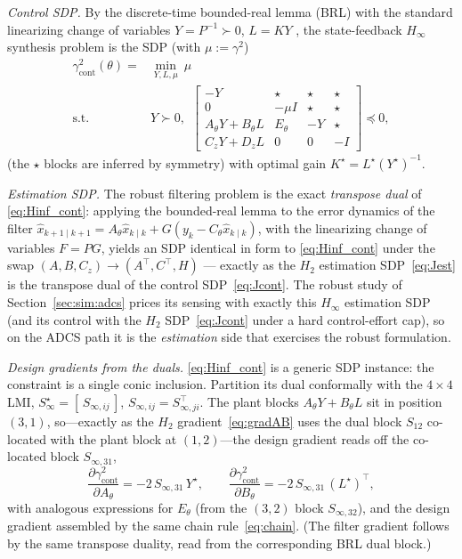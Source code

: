 \documentclass[twocolumn,amsthm]{autart}
\begin{document}
\emph{Control SDP.} By the discrete-time bounded-real lemma (BRL) with the standard
linearizing change of variables $Y = P^{-1}\succ 0$, $L = KY$
\cite{boyd1994linear,grigoriadis1998integrate}, the state-feedback $H_\infty$
synthesis problem is the SDP (with $\mu := \gamma^2$)
\begin{equation}\label{eq:Hinf_cont}
\begin{aligned}
\gamma^2_{\mathrm{cont}}(\theta) = &\min_{Y,L,\mu}\ \mu \\
\text{s.t. } & Y \succ 0,\ \
\begin{bmatrix}
-Y & \star & \star & \star \\
0 & -\mu I & \star & \star \\
A_\theta Y + B_\theta L & E_\theta & -Y & \star \\
C_z Y + D_z L & 0 & 0 & -I
\end{bmatrix} \preceq 0,
\end{aligned}
\end{equation}
(the $\star$ blocks are inferred by symmetry) with optimal gain
$K^\star = L^\star (Y^\star)^{-1}$.

\emph{Estimation SDP.} The robust filtering problem is the exact \emph{transpose
dual} of \eqref{eq:Hinf_cont}: applying the bounded-real lemma to the error dynamics
of the filter $\hat x_{k+1\mid k+1}=A_\theta\hat x_{k\mid k}+G(y_k-C_\theta\hat x_{k\mid k})$,
with the linearizing change of variables $F=PG$, yields an SDP identical in form to
\eqref{eq:Hinf_cont} under the swap $(A,B,C_z)\!\to\!(A^\top,C^\top,H)$ --- exactly as
the $H_2$ estimation SDP~\eqref{eq:Jest} is the transpose dual of the control
SDP~\eqref{eq:Jcont}. The robust study of Section~\ref{sec:sim:adcs} prices its
sensing with exactly this $H_\infty$ estimation SDP (and its control with the $H_2$
SDP~\eqref{eq:Jcont} under a hard control-effort cap), so on the ADCS path it is the
\emph{estimation} side that exercises the robust formulation.

\emph{Design gradients from the duals.} \eqref{eq:Hinf_cont} is a generic SDP
instance: the constraint is a single conic inclusion. Partition its dual
conformally with the $4\times4$ LMI,
$S_{\infty}^\star = [\,S_{\infty,ij}\,]$, $S_{\infty,ij}=S_{\infty,ji}^\top$. The plant blocks
$A_\theta Y + B_\theta L$ sit in position $(3,1)$, so---exactly as the $H_2$
gradient~\eqref{eq:gradAB} uses the dual block $S_{12}$ co-located with the plant
block at $(1,2)$---the design gradient reads off the co-located block $S_{\infty,31}$,
\begin{equation}\label{eq:gradHinf}
\frac{\partial \gamma^2_{\mathrm{cont}}}{\partial A_\theta} = -2\,S_{\infty,31}\,Y^\star,
\qquad
\frac{\partial \gamma^2_{\mathrm{cont}}}{\partial B_\theta} = -2\,S_{\infty,31}\,(L^\star)^\top,
\end{equation}
with analogous expressions for $E_\theta$ (from the $(3,2)$ block $S_{\infty,32}$),
and the design gradient assembled by the same chain rule~\eqref{eq:chain}. (The
filter gradient follows by the same transpose duality, read from the corresponding
BRL dual block.)
\end{document}
